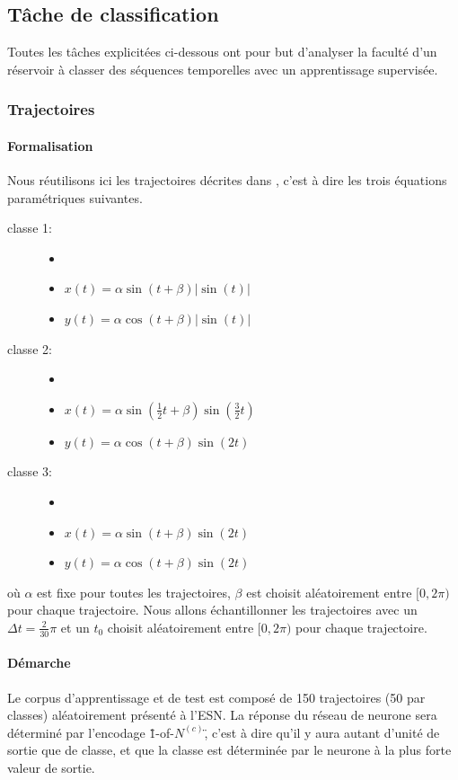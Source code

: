 \documentclass[12pt]{article}
\begin{document}
\subsection{Tâche de classification}

Toutes les tâches explicitées ci-dessous ont pour but d'analyser la faculté d'un réservoir à classer des séquences temporelles avec un apprentissage supervisée.

\subsubsection{Trajectoires}
\paragraph{Formalisation}
Nous réutilisons ici les trajectoires décrites dans \cite{HuskenStagge}, c'est à dire les trois équations paramétriques suivantes.
\begin{description}
\item[classe 1:]
\begin{itemize}
\item
\item $x(t) = \alpha \sin(t+\beta)|\sin(t)|$
\item $y(t) = \alpha \cos(t+\beta)|\sin(t)|$
\end{itemize}
\item[classe 2:] 
\begin{itemize}
\item
\item $x(t) = \alpha \sin(\frac{1}{2}t+\beta)\sin(\frac{3}{2}t)$
\item $y(t) = \alpha \cos(t+\beta)\sin(2t)$
\end{itemize}
\item[classe 3:] 
\begin{itemize}
\item
\item $x(t) = \alpha \sin(t+\beta)\sin(2t)$
\item $y(t) = \alpha \cos(t+\beta)\sin(2t)$
\end{itemize}
\end{description}
où $\alpha$ est fixe pour toutes les trajectoires, $\beta$ est choisit aléatoirement entre $[0, 2\pi)$ pour chaque trajectoire. Nous allons échantillonner les trajectoires avec un $\Delta t = \frac{2}{30}\pi$ et un $t_0$ choisit aléatoirement entre $[0, 2\pi)$ pour chaque trajectoire.

\paragraph{Démarche}
Le corpus d'apprentissage et de test est composé de 150 trajectoires (50 par classes) aléatoirement présenté à l'ESN. La réponse du réseau de neurone sera déterminé par l'encodage \"1-of-$N^{(c)}$\", c'est à dire qu'il y aura autant d'unité de sortie que de classe, et que la classe est déterminée par le neurone à la plus forte valeur de sortie.
\end{document}
